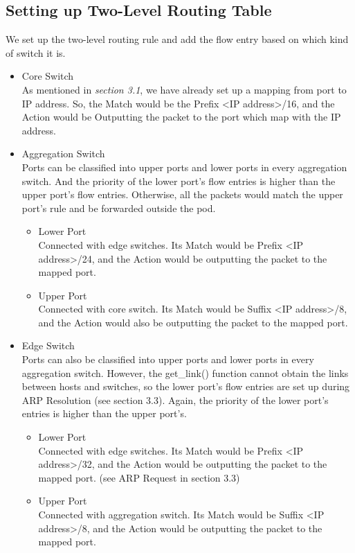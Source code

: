 \documentclass[a4paper,11pt]{article}
\begin{document}
\subsection{Setting up Two-Level Routing Table}
We set up the two-level routing rule and add the flow entry based on which kind of switch it is.
\begin{itemize}
    \item Core Switch\\
    As mentioned in \textit{section 3.1}, we have already set up a mapping from port to IP address.  So, the Match would be the Prefix <IP address>/16, and the Action would be Outputting the packet to the port which map with the IP address.
    \item Aggregation Switch\\
    Ports can be classified into upper ports and lower ports in every aggregation switch.  And the priority of the lower port's flow entries is higher than the upper port's flow entries.  Otherwise, all the packets would match the upper port's rule and be forwarded outside the pod.
    \begin{itemize}
        \item Lower Port\\
        Connected with edge switches. Its Match would be Prefix <IP address>/24, and the Action would be outputting the packet to the mapped port.
        \item Upper Port\\
        Connected with core switch.  Its Match would be Suffix <IP address>/8, and the Action would also be outputting the packet to the mapped port.
    \end{itemize}
    \item Edge Switch\\
    Ports can also be classified into upper ports and lower ports in every aggregation switch.  However, the get\_link() function cannot obtain the links between hosts and switches, so the lower port's flow entries are set up during ARP Resolution (see section 3.3).  Again, the priority of the lower port's entries is higher than the upper port's.
    \begin{itemize}
        \item Lower Port\\
        Connected with edge switches. Its Match would be Prefix <IP address>/32, and the Action would be outputting the packet to the mapped port. (see ARP Request in section 3.3)
        \item Upper Port\\
        Connected with aggregation switch.  Its Match would be Suffix <IP address>/8, and the Action would be outputting the packet to the mapped port.
    \end{itemize}
\end{itemize}
\end{document}

